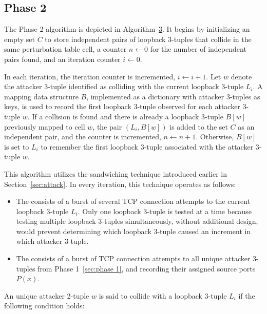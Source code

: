 \documentclass[twocolumn]{report}
\begin{document}
\vspace{0.2cm}


\subsection{Phase 2}
\label{sec:phase 2}

The Phase 2 algorithm is depicted in Algorithm~\hyperref[alg:phase2]{3}. It begins by initializing an empty set $C$ to store \alert{independent pairs of loopback 3-tuples} that collide in the same perturbation table cell, a counter $n \leftarrow 0$ for the \alert{number of independent pairs found}, and an \alert{iteration counter} $i \leftarrow 0$.

In each iteration, the iteration counter is incremented, \(i \leftarrow i+1\). Let \(w\) denote the attacker 3-tuple identified as colliding with the current loopback 3-tuple \(L_i\). A mapping data structure \(B\), implemented as a \alert{dictionary} with attacker 3-tuples as keys, is used to record the first loopback 3-tuple observed for each attacker 3-tuple \(w\). \alert{If a collision is found} and there is already a loopback 3-tuple \(B[w]\) previously mapped to cell \(w\), the pair \((L_i, B[w])\) is added to the set \(C\) as an independent pair, and the counter is incremented, \(n \leftarrow n+1\). \alert{Otherwise}, \(B[w]\) is set to \(L_i\) to remember the first loopback 3-tuple associated with the attacker 3-tuple \(w\).

This algorithm utilizes the sandwiching technique introduced earlier in Section~\ref{sec:attack}. In every iteration, this technique operates as follows:
\begin{itemize}
	\item The  consists of a burst of several TCP connection attempts to the current loopback 3-tuple $L_i$. Only one loopback 3-tuple is tested at a time because testing multiple loopback 3-tuples simultaneously, without additional design, would prevent determining which loopback 3-tuple caused an increment in which attacker 3-tuple.
	\item The  consists of a burst of TCP connection attempts to all unique attacker 3-tuples from Phase 1~\ref{sec:phase 1}, and recording their assigned source ports $P(x)$.
\end{itemize}

An \alert{unique attacker 2-tuple \(w\)} is said to collide with a \alert{loopback 3-tuple \(L_i\)} if the following \alert{condition} holds:
\end{document}
